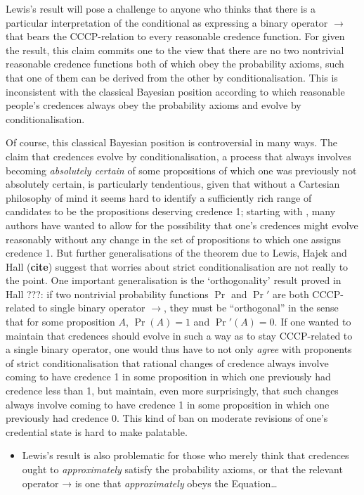 \documentclass[leqno, 11pt, a5paper, openany]{article}
\DeclareMathOperator{\prob}{Pr}
\begin{document}
Lewis's result will pose a challenge to anyone who thinks that there is a particular interpretation of the conditional as expressing a binary operator $→$ that bears the CCCP-relation to every reasonable credence function. For given the result, this claim commits one to the view that there are no two nontrivial reasonable credence functions both of which obey the probability axioms, such that one of them can be derived from the other by conditionalisation. This is inconsistent with the classical Bayesian position according to which reasonable people's credences always obey the probability axioms and evolve by conditionalisation.

Of course, this classical Bayesian position is controversial in many ways. The claim that credences evolve by conditionalisation, a process that always involves becoming \emph{absolutely certain} of some propositions of which one was previously not absolutely certain, is particularly tendentious, given that without a Cartesian philosophy of mind it seems hard to identify a sufficiently rich range of candidates to be the propositions deserving credence 1; starting with \citet{JeffreySILP}, many authors have wanted to allow for the possibility that one's credences might evolve reasonably without any change in the set of propositions to which one assigns credence 1. But further generalisations of the theorem due to Lewis, Hajek and Hall (\textbf{cite}) suggest that worries about strict conditionalisation are not really to the point. One important generalisation is the ‘orthogonality’ result proved in Hall ???: if two nontrivial probability functions $\prob$ and $\prob'$ are both CCCP-related to single binary operator $→$, they must be “orthogonal” in the sense that for some proposition $A$, $\prob(A)=1$ and $\prob'(A)=0$. If one wanted to maintain that credences should evolve in such a way as to stay CCCP-related to a single binary operator, one would thus have to not only \emph{agree} with proponents of strict conditionalisation that rational changes of credence always involve coming to have credence 1 in some proposition in which one previously had credence less than 1, but maintain, even more surprisingly, that such changes always involve coming to have credence 1 in some proposition in which one previously had credence 0. This kind of ban on moderate revisions of one's credential state is hard to make palatable.

\begin{itemize}
\item
  Lewis's result is also problematic for those who merely think that
  credences ought to \emph{approximately} satisfy the probability
  axioms, or that the relevant operator → is one that
  \emph{approximately} obeys the Equation\ldots{}
\end{itemize}
\end{document}
